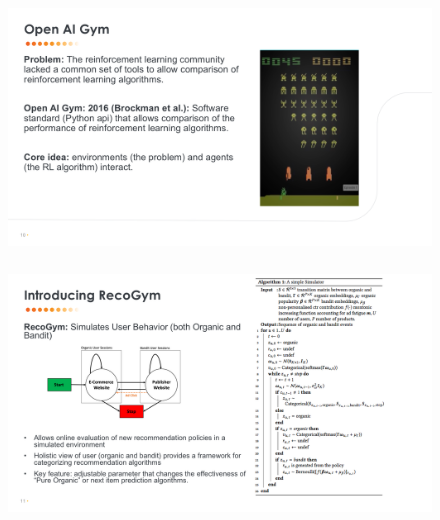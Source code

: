 \begin{frame}
  \frametitle{}
 
 
   \begin{figure}[h!]
     \includegraphics[scale=0.39]{images/openai.png}
       \centering
       \label{motex1}
   \end{figure}
     
 \end{frame}



 \begin{frame}
  \frametitle{}
 
 
   \begin{figure}[h!]
     \includegraphics[scale=0.34]{images/recogym1}
       \centering
       \label{motex1}
   \end{figure}
     
 \end{frame}





